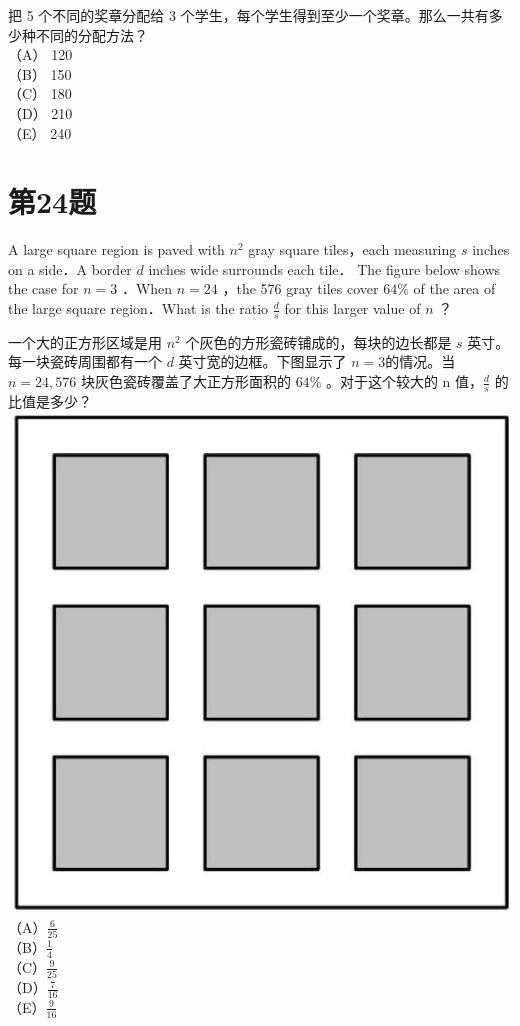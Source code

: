 \documentclass[10pt]{article}
\begin{document}
把 5 个不同的奖章分配给 3 个学生，每个学生得到至少一个奖章。那么一共有多少种不同的分配方法？\\
（A） 120\\
（B） 150\\
（C） 180\\
（D） 210\\
（E） 240

\section*{第24题}
A large square region is paved with $n^{2}$ gray square tiles，each measuring $s$ inches on a side．A border $d$ inches wide surrounds each tile． The figure below shows the case for $n=3$ ．When $n=24$ ，the 576 gray tiles cover $64 \%$ of the area of the large square region．What is the ratio $\frac{d}{s}$ for this larger value of $n$ ？

一个大的正方形区域是用 $n^{2}$ 个灰色的方形瓷砖铺成的，每块的边长都是 $s$ 英寸。每一块瓷砖周围都有一个 $d$ 英寸宽的边框。下图显示了 $n=3$的情况。当 $n=24,576$ 块灰色瓷砖覆盖了大正方形面积的 $64 \%$ 。对于这个较大的 n 值，$\frac{d}{s}$ 的比值是多少？\\
\includegraphics[max width=\textwidth, center]{2025_09_05_48544237b06df716137eg-15}\\
（A）$\frac{6}{25}$\\
（B）$\frac{1}{4}$\\
（C）$\frac{9}{25}$\\
（D）$\frac{7}{16}$\\
（E）$\frac{9}{16}$
\end{document}
